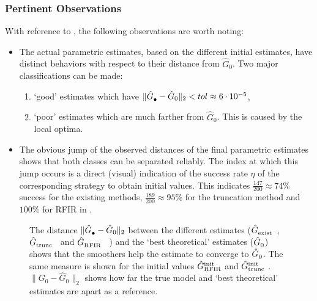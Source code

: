 \subsubsection{Pertinent Observations}
With reference to , the following observations are worth noting: 
\begin{itemize}
\item The actual parametric estimates, based on the different initial estimates, have distinct behaviors with respect to their distance from $\hat{G}_{0}$.
Two major classifications can be made:
\begin{enumerate}
  \item `good' estimates which have $\|\model{\bullet} - \hat{G}_{0} \|_2 < tol \approx 6 \cdot 10^{-5}$,
  \item `poor' estimates which are much farther from $\hat{G}_{0}$.  This is caused by the local optima.
\end{enumerate}
\item
The obvious jump of the observed distances of the final parametric estimates shows that both classes can be separated reliably.
The index at which this jump occurs is a direct (visual) indication of the success rate $\eta$ of the corresponding strategy to obtain initial values.
This indicates $\frac{147}{200} \approx 74\%$ success for the existing methods, $\frac{189}{200} \approx 95\%$ for the truncation method and $100\%$ for RFIR in .
\end{itemize}

\begin{figure}
  \centering
  \setlength{\figurewidth}{0.8\onecolumnwidth}
  \setlength{\figureheight}{0.6\figurewidth}
  
 \caption[Model error for different initialization schemes on simulations.]{The distance $\|\model{\bullet} - \hat{G}_0 \|_2$  between the different estimates ($\model{exist}$~, $\model{trunc}$~ and $\model{RFIR}$~ ) and the `best theoretical' estimates ($\model{0}$) shows that the smoothers help the estimate to converge to $\model{0}$.
 The same measure is shown for the initial values $\model[init]{RFIR}$  and $\model[init]{trunc}$ .
 $\|{G}_{0} - \hat{G}_0\|_2$ shows how far the true model and `best theoretical' estimates are apart as a reference. }
  \label{fig:single-sim}
\end{figure}

